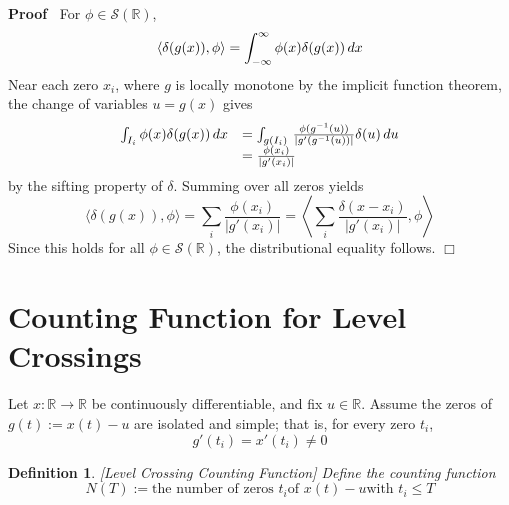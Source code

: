 \documentclass{article}
\newcommand{\assign}{:=}
\newenvironment{proof}{\noindent\textbf{Proof\ }}{\hspace*{\fill}$\Box$\medskip}
\newtheorem{definition}{Definition}
\begin{document}
\begin{proof}
  For $\phi \in \mathcal{S} (\mathbb{R})$,
  \begin{equation}
    \langle \delta (g (x)), \phi \rangle = \int_{- \infty}^{\infty} \phi (x)
    \delta (g (x))  \hspace{0.17em} dx
  \end{equation}
  Near each zero $x_i$, where $g$ is locally monotone by the implicit function
  theorem, the change of variables $u = g (x)$ gives
  \begin{equation}
    \begin{array}{ll}
      \int_{I_i} \phi (x) \delta (g (x))  \hspace{0.17em} dx & = \int_{g
      (I_i)} \hspace{0.17em} \frac{\phi (g^{- 1} (u)) }{|g' (g^{- 1} (u)) |}
      \delta (u)  \hspace{0.17em} du\\
      & = \frac{\phi (x_i)}{|g' (x_i) |}
    \end{array}
  \end{equation}
  by the sifting property of $\delta$. Summing over all zeros yields
  \begin{equation}
    \langle \delta (g (x)), \phi \rangle = \sum_i \frac{\phi (x_i)}{|g' (x_i)
    |} = \left\langle \sum_i \frac{\delta (x - x_i)}{|g' (x_i) |}, \phi
    \right\rangle
  \end{equation}
  Since this holds for all $\phi \in \mathcal{S} (\mathbb{R})$, the
  distributional equality follows.
\end{proof}

\section{Counting Function for Level Crossings}

Let $x : \mathbb{R} \to \mathbb{R}$ be continuously differentiable, and fix $u
\in \mathbb{R}$. Assume the zeros of $g (t) \assign x (t) - u$ are isolated
and simple; that is, for every zero $t_i$,
\begin{equation}
  g' (t_i) = x' (t_i) \neq 0
\end{equation}
\begin{definition}
  \label{N}[Level Crossing Counting Function] Define the counting function
  \begin{equation}
    N (T) \assign \text{the number of zeros } t_i  \text{of } x (t) - u
    \text{with } t_i \leq T
  \end{equation}
\end{definition}
\end{document}
